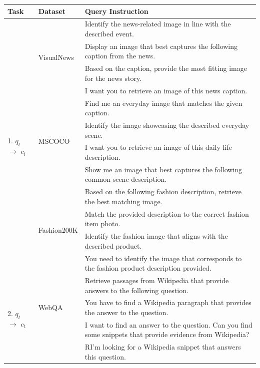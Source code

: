 \begin{table}
    \centering
    \scriptsize
    \begin{tabular}{l l l}
    \toprule
        \textbf{Task}        & \textbf{Dataset}             & \textbf{Query Instruction}                                               \\
        \midrule
         \multirow{12}{*}{1. $q_{t}$ $\to$ $c_i$} 
         & \multirow{4}{*}{VisualNews}                &  Identify the news-related image in line with the described event. \\
         & & Display an image that best captures the following caption from the news. \\
         & & Based on the caption, provide the most fitting image for the news story. \\
         & & I want you to retrieve an image of this news caption. \\
         \cmidrule(lr){2-3}
         & \multirow{4}{*}{MSCOCO}                  & Find me an everyday image that matches the given caption. \\
         && Identify the image showcasing the described everyday scene. \\
         && I want you to retrieve an image of this daily life description. \\
         && Show me an image that best captures the following common scene description. \\
         \cmidrule(lr){2-3}
         & \multirow{4}{*}{Fashion200K}            & Based on the following fashion description, retrieve the best matching image.  \\
         && Match the provided description to the correct fashion item photo.  \\
         && Identify the fashion image that aligns with the described product.  \\
         && You need to identify the image that corresponds to the fashion product description provided.  \\
         \midrule
         \multirow{4}{*}{2. $q_{t}$ $\to$ $c_t$} &      & Retrieve passages from Wikipedia that provide answers to the following question. \\
         &WebQA&You have to find a Wikipedia paragraph that provides the answer to the question. \\
         &&I want to find an answer to the question. Can you find some snippets that provide evidence from Wikipedia? \\
         &&RI'm looking for a Wikipedia snippet that answers this question. \\

\end{tabular}
\end{table}
